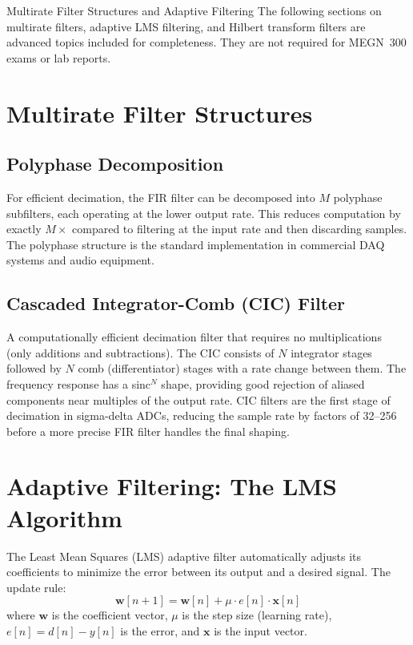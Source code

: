 \documentclass[11pt,letterpaper,twoside,openany]{book}
\begin{document}
\begin{advancedbox}{Multirate Filter Structures and Adaptive Filtering}
The following sections on multirate filters, adaptive LMS filtering, and Hilbert transform filters are advanced topics included for completeness. They are not required for MEGN~300 exams or lab reports.
\end{advancedbox}
\section{Multirate Filter Structures}
\subsection{Polyphase Decomposition}
For efficient decimation, the FIR filter can be decomposed into $M$ polyphase subfilters, each operating at the lower output rate. This reduces computation by exactly $M\times$ compared to filtering at the input rate and then discarding samples. The polyphase structure is the standard implementation in commercial DAQ systems and audio equipment.

\subsection{Cascaded Integrator-Comb (CIC) Filter}
A computationally efficient decimation filter that requires no multiplications (only additions and subtractions). The CIC consists of $N$ integrator stages followed by $N$ comb (differentiator) stages with a rate change between them. The frequency response has a sinc$^N$ shape, providing good rejection of aliased components near multiples of the output rate. CIC filters are the first stage of decimation in sigma-delta ADCs, reducing the sample rate by factors of 32--256 before a more precise FIR filter handles the final shaping.

\section{Adaptive Filtering: The LMS Algorithm}
The Least Mean Squares (LMS) adaptive filter automatically adjusts its coefficients to minimize the error between its output and a desired signal. The update rule:
\begin{equation}
\mathbf{w}[n+1] = \mathbf{w}[n] + \mu \cdot e[n] \cdot \mathbf{x}[n]
\end{equation}
where $\mathbf{w}$ is the coefficient vector, $\mu$ is the step size (learning rate), $e[n] = d[n] - y[n]$ is the error, and $\mathbf{x}$ is the input vector.
\end{document}
